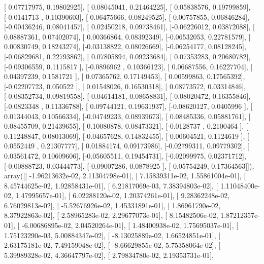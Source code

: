 \documentclass{article}
\begin{document}
       [ 0.07717975,  0.19802925],
       [ 0.08045041,  0.21464225],
       [ 0.05838576,  0.19799859],
       [-0.0141713 ,  0.10390603],
       [ 0.06475666,  0.08249525],
       [-0.00757855,  0.06846284],
       [-0.00436246,  0.08041457],
       [ 0.02450218,  0.09738461],
       [-0.06226012,  0.03872088],
       [ 0.08887361,  0.07402074],
       [ 0.00366864,  0.08392349],
       [-0.06532053,  0.22781579],
       [ 0.00830749,  0.18243274],
       [-0.03138822,  0.08026669],
       [-0.06254177,  0.08128245],
       [-0.06829681,  0.22793862],
       [ 0.07805894,  0.09233684],
       [ 0.07353283,  0.20680782],
       [-0.09306559,  0.1115817 ],
       [-0.0896962 ,  0.10366123],
       [ 0.06687556,  0.16227704],
       [ 0.04397239,  0.1581721 ],
       [ 0.07365762,  0.17149453],
       [ 0.00599863,  0.17565392],
       [-0.02207723,  0.050522  ],
       [ 0.01548026,  0.16530318],
       [ 0.08773572,  0.03314846],
       [-0.08352734,  0.09819558],
       [-0.04614181,  0.08658831],
       [-0.08020472,  0.16355846],
       [-0.0823348 ,  0.11336788],
       [ 0.09744121,  0.19631937],
       [-0.08620127,  0.0405996 ],
       [ 0.01344043,  0.10566334],
       [-0.04749233,  0.08939673],
       [ 0.08485336,  0.05881761],
       [ 0.08455709,  0.21439655],
       [ 0.10080878,  0.08473321],
       [-0.0128737 ,  0.2100464 ],
       [ 0.11248847,  0.08013069],
       [-0.04657628,  0.14832455],
       [ 0.00604521,  0.1124619 ],
       [ 0.0552449 ,  0.21307777],
       [ 0.01884174,  0.09173986],
       [-0.02799311,  0.09779302],
       [ 0.03561472,  0.10609606],
       [-0.05605511,  0.19454731],
       [-0.02099975,  0.02371712],
       [-0.00888723,  0.03444773],
       [-0.09007286,  0.0878925 ],
       [ 0.05754249,  0.17364563]]), array([[ -1.96213632e-02,   2.11304798e-01],
       [  7.15839311e-02,   1.55861004e-01],
       [  8.45744625e-02,   1.92858431e-01],
       [  6.21817069e-03,   7.38394803e-02],
       [  1.11048400e-02,   1.47995657e-01],
       [  6.02288120e-02,   1.20374261e-01],
       [  9.28362248e-02,   6.76029813e-02],
       [ -5.52676926e-02,   1.45331891e-01],
       [  1.86961790e-02,   8.37922863e-02],
       [  2.58965283e-02,   2.29677073e-01],
       [  8.15482506e-02,   1.87212357e-01],
       [ -6.00686895e-02,   2.04520264e-01],
       [  1.48400938e-02,   1.75695037e-01],
       [  1.75123290e-03,   5.00884347e-02],
       [ -8.13025889e-02,   1.66524851e-01],
       [  2.63175181e-02,   7.49159048e-02],
       [ -8.66629855e-02,   5.75358064e-02],
       [  5.39989328e-02,   4.36647797e-02],
       [  2.79834780e-02,   2.19353731e-01],
\end{document}
